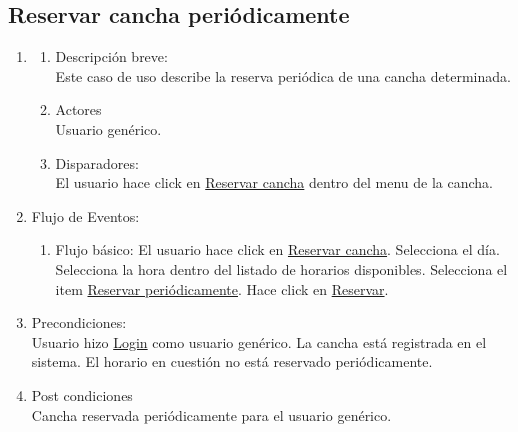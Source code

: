 \documentclass[a4paper,11pt]{article}
\begin{document}
\subsection{Reservar cancha periódicamente}
\begin{enumerate}

    \item
    \begin{enumerate}
    \item Descripción breve: \\
        Este caso de uso describe la reserva periódica de una cancha determinada.
    \item Actores \\
        Usuario genérico.
    \item Disparadores: \\
        El usuario hace click en \underline{Reservar cancha}
        dentro del menu de la cancha.
    \end{enumerate}

    \item Flujo de Eventos:

    \begin{enumerate}

        \item Flujo básico:
            El usuario hace click en \underline{Reservar cancha}.
            Selecciona el día.
            Selecciona la hora dentro del listado de horarios disponibles.
            Selecciona el item \underline{Reservar periódicamente}.
            Hace click en \underline{Reservar}.
    \end{enumerate}

    \item Precondiciones: \\
        Usuario hizo \underline{Login} como usuario genérico.
        La cancha está registrada en el sistema.
        El horario en cuestión no está reservado periódicamente.

    \item Post condiciones \\
        Cancha reservada periódicamente para el usuario genérico.

\end{enumerate}
\end{document}
